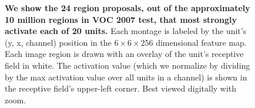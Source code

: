 \begin{figure}[t!]
\caption{\textbf{We show the 24 region proposals, out of the approximately 10 million regions in VOC 2007 test, that most strongly activate each of 20 units.}
Each montage is labeled by the unit's (y, x, channel) position in the $6 \times 6 \times 256$ dimensional  feature map.
Each image region is drawn with an overlay of the unit's receptive field in white.
The activation value (which we normalize by dividing by the max activation value over all units in a channel) is shown in the receptive field's upper-left corner.
Best viewed digitally with zoom.}
\end{figure}

